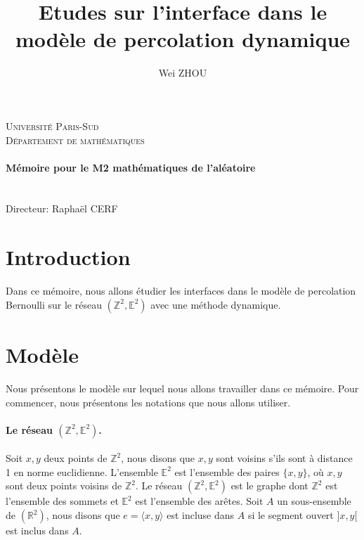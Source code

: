 \documentclass[titlepage,a4paper,12pt]{article}
\title{Etudes sur l'interface dans le modèle de percolation dynamique}
\author{Wei ZHOU}
\begin{document}
\makeatletter
  \begin{titlepage}
  \centering
      {\large \textsc{Université Paris-Sud}}\\
      \textsc{Département de mathématiques}\\
      {\large\textbf{	\@date\\
       Mémoire pour le M2 mathématiques de l'aléatoire}}\\
    \vfill
       {\LARGE \textbf{\@title}} \\
    \vspace{2em}
        {\large \@author} \\
    \vspace{2em}
    		{\large Directeur: Rapha\"{e}l CERF}
    \vfill
  \end{titlepage}
\makeatother

\tableofcontents

\newpage
\section{Introduction}
Dans ce mémoire, nous allons étudier les interfaces dans le modèle de percolation Bernoulli sur le réseau $(\mathbb{Z}^2,\mathbb{E}^2)$ avec une méthode dynamique.

\section{Modèle}
Nous présentons le modèle sur lequel nous allons travailler dans ce mémoire. Pour commencer, nous présentons les notations que nous allons utiliser.

\paragraph{Le réseau $(\mathbb{Z}^2,\mathbb{E}^2)$.} Soit $x,y$ deux points de $\mathbb{Z}^2$, nous disons que $x,y$ sont voisins s'ils sont à distance 1 en norme euclidienne. L'ensemble $\mathbb{E}^2$ est l'ensemble des paires $\{x,y\}$, où $x,y$ sont deux points voisins de $\mathbb{Z}^2$. Le réseau $(\mathbb{Z}^2, \mathbb{E}^2)$ est le graphe dont $\mathbb{Z}^2$ est l'ensemble des sommets et $\mathbb{E}^2$ est l'ensemble des arêtes. Soit $A$ un sous-ensemble de $(\mathbb{R}^2)$, nous disons que $e = \langle x,y\rangle$ est incluse dans $A$ si le segment ouvert $]x,y[$ est inclus dans $A$.
\end{document}
